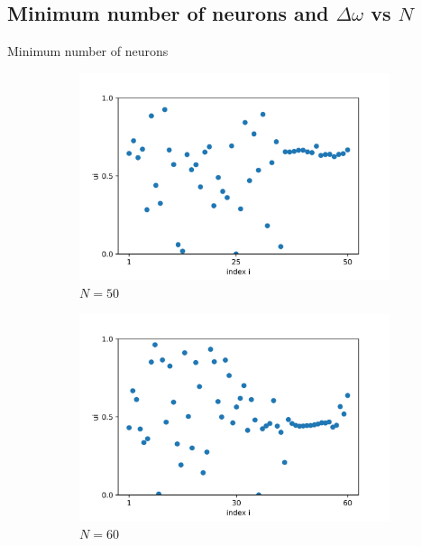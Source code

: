 \documentclass{beamer}
\begin{document}
\subsection{Minimum number of neurons and $\Delta \omega$ vs $N$}
\begin{frame}{Minimum number of neurons} \pause

\begin{figure}[H]
\begin{subfigure}{.32\textwidth}
  \centering
  \includegraphics[width=1\linewidth]{u_N=50.png}  
  \caption{$N=50$}
\end{subfigure}
\hfill
\begin{subfigure}{.32\textwidth}
  \centering
  \includegraphics[width=1\linewidth]{u_N=60.png}  
  \caption{$N=60$}
\end{subfigure}
\hfill
\begin{subfigure}{.32\textwidth}

\end{subfigure}
\end{figure}
\end{frame}
\end{document}
